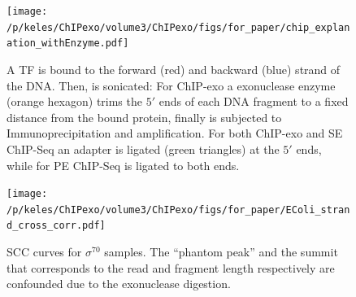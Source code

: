 \documentclass{bmcart}\usepackage[]{graphicx}\usepackage[]{color}
\newcommand{\sig}{\sigma^{70}}
\begin{document}
\begin{figure}[h!]
  \centering
  \texttt{[image: /p/keles/ChIPexo/volume3/ChIPexo/figs/for\_paper/chip\_explanation\_withEnzyme.pdf]}
  \caption{A TF is bound to the forward (red) and backward (blue)
    strand of the DNA. Then, is sonicated: For ChIP-exo a exonuclease
    enzyme (orange hexagon) trims the $5\prime$ ends of each DNA
    fragment to a fixed distance from the bound protein, finally is
    subjected to Immunoprecipitation and amplification. For both
    ChIP-exo and SE ChIP-Seq an adapter is ligated (green triangles)
    at the $5\prime$ ends, while for PE ChIP-Seq is ligated to both
    ends.}
  \label{fig:chip_diagram}
\end{figure}
\newpage

\begin{figure}[h!]
\centering
\texttt{[image: /p/keles/ChIPexo/volume3/ChIPexo/figs/for\_paper/EColi\_strand\_cross\_corr.pdf]}
\caption{SCC curves for $\sig$ samples. The ``phantom peak'' and the
  summit that corresponds to the read and fragment length respectively
  are confounded due to the exonuclease digestion.}
  \label{fig:scc_exo}
\end{figure}

\newpage
\end{document}
